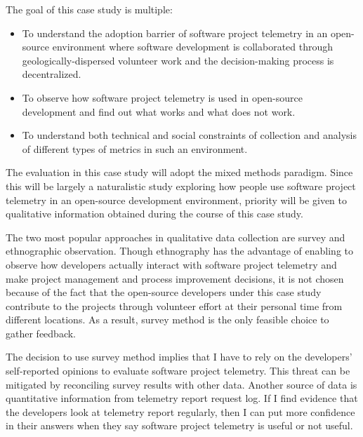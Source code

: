 The goal of this case study is multiple:

\begin{itemize}
	\item To understand the adoption barrier of software project telemetry in an open-source environment where software development is collaborated through geologically-dispersed volunteer work and the decision-making process is decentralized. %
  \item To observe how software project telemetry is used in open-source development and find out what works and what does not work. 
	\item To understand both technical and social constraints of collection and analysis of different types of metrics in such an environment. 
\end{itemize}

The evaluation in this case study will adopt the mixed methods paradigm. Since this will be largely a naturalistic study exploring how people use software project telemetry in an open-source development environment, priority will be given to qualitative information obtained during the course of this case study. 

The two most popular approaches in qualitative data collection are survey and ethnographic observation. Though ethnography has the advantage of enabling to observe how developers actually interact with software project telemetry and make project management and process improvement decisions, it is not chosen because of the fact that the open-source developers under this case study contribute to the projects through volunteer effort at their personal time from different locations. As a result, survey method is the only feasible choice to gather feedback. 

The decision to use survey method implies that I have to rely on the developers' self-reported opinions to evaluate software project telemetry. This threat can be mitigated by reconciling survey results with other data. Another source of data is quantitative information from telemetry report request log. If I find evidence that the developers look at telemetry report regularly, then I can put more confidence in their answers when they say software project telemetry is useful or not useful.




